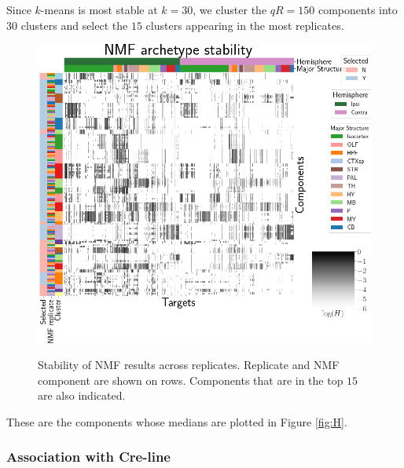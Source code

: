 Since $k$-means is most stable at $k=30$, we cluster the $qR = 150$ components into $30$ clusters and select the $15$ clusters appearing in the most replicates.
\begin{figure}[H]
    \centering
    \includegraphics[width = 5in]{figs/nmfcluster.png} 
    \label{fig:distances}
    \caption{Stability of NMF results across replicates. 
    Replicate and NMF component are shown on rows.
    Components that are in the top $15$ are also indicated.}
\end{figure}
These are the components whose medians are plotted in Figure \ref{fig:H}.

\newpage

\subsubsection{Association with Cre-line}

